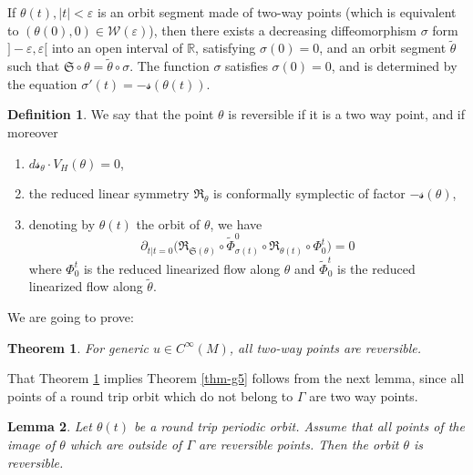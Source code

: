 \documentclass[JEP,XML,SOM,Unicode,published]{cedram}
\let\epsilon\varepsilon
\newcommand{\Rm}{\mathbb{R}}
\newcommand{\gR}{\ensuremath{\mathfrak{R}}}
\newcommand{\gS}{\ensuremath{\mathfrak{S}}}
\newcommand{\ms}{\ensuremath{\mathscr{s}}}
\newcommand{\mW}{\ensuremath{\mathcal{W}}}
\theoremstyle{plain}
\newtheorem{lem}{Lemma}
\newtheorem{thm}{Theorem}
\theoremstyle{definition}
\newtheorem{defn}[lem]{Definition}
\begin{document}
If $\theta(t), |t|<\epsilon$ is an orbit segment made of two-way points (which is equivalent to $(\theta(0),0)\in \mW(\epsilon)$), then
there exists a decreasing diffeomorphism $\sigma $ form $]-\epsilon,\epsilon[$ into an open interval of $\Rm$, satisfying
$\sigma(0)=0$, and an orbit segment
$\tilde \theta$ such that $\gS\circ \theta = \tilde \theta\circ \sigma$. The function $\sigma$ satisfies $\sigma(0)=0$, and is determined by the equation
$ \sigma'(t)=-\ms(\theta(t))$.

\begin{defn}\label{def-rp}
We say that the point $\theta$ is reversible if it is a two way point, and if moreover
\begin{enumerate}
\item
$d\ms_{\theta}\cdot V_H(\theta)=0$,
\item
the reduced linear symmetry $\gR_{\theta}$ is conformally symplectic of factor $-\ms(\theta)$,
\item
denoting by $\theta(t)$ the orbit of $\theta$, we have
\[
\partial_{t|t=0} \big(\gR_{\gS(\theta)}\circ\tilde \Phi_{\sigma(t)}^0\circ\gR_{\theta(t)}\circ \Phi_0^t\big) =0
\]
where $\Phi_0^t$ is the reduced linearized flow along $\theta$ and $\tilde \Phi_0^t$ is the reduced linearized flow along $\tilde \theta$.
\end{enumerate}
\end{defn}

We are going to prove:

\begin{thm}\label{thm-twr}
For generic $u\in C^{\infty}(M)$, all two-way points are reversible.
\end{thm}

That Theorem \ref{thm-twr} implies Theorem \ref{thm-g5} follows from the next lemma, since all points
of a round trip orbit which do not belong to $\Gamma$ are two way points.

\begin{lem}\label{lem-rtr}
Let $\theta(t)$ be a round trip periodic orbit. Assume that all points of the image of $\theta$ which are outside of $\Gamma$ are reversible points. Then the orbit $\theta$ is reversible.
\end{lem}
\end{document}
